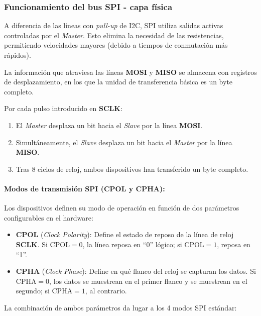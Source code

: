 \documentclass[../main.tex]{subfiles}
\begin{document}
        \subsubsection{Funcionamiento del bus SPI - capa física}

            A diferencia de las líneas con \emph{pull-up} de I2C, SPI utiliza salidas activas controladas por el \emph{Master}. Esto elimina la necesidad de las resistencias, permitiendo velocidades mayores (debido a tiempos de conmutación más rápidos).

            La información que atraviesa las líneas \textbf{MOSI} y \textbf{MISO} se almacena con registros de desplazamiento, en los que la unidad de transferencia básica es un byte completo. 

            Por cada pulso introducido en \textbf{SCLK}:
            \begin{enumerate}
                \item El \emph{Master} desplaza un bit hacia el \emph{Slave} por la línea \textbf{MOSI}.
                \item Simultáneamente, el \emph{Slave} desplaza un bit hacia el \emph{Master} por la línea \textbf{MISO}.
                \item Tras 8 ciclos de reloj, ambos dispositivos han transferido un byte completo.
            \end{enumerate}

            \paragraph{Modos de transmisión SPI (CPOL y CPHA):}
            Los dispositivos definen su modo de operación en función de dos parámetros configurables en el hardware:

            \begin{itemize}
                \item \textbf{CPOL} (\emph{Clock Polarity}): Define el estado de reposo de la línea de reloj \textbf{SCLK}. Si $\text{CPOL}=0$, la línea reposa en ``0'' lógico; si $\text{CPOL}=1$, reposa en ``1''.
                \item \textbf{CPHA} (\emph{Clock Phase}): Define en qué flanco del reloj se capturan los datos. Si $\text{CPHA}=0$, los datos se muestrean en el primer flanco y se muestrean en el segundo; si $\text{CPHA}=1$, al contrario.
            \end{itemize}

            La combinación de ambos parámetros da lugar a los 4 modos SPI estándar:
\end{document}
